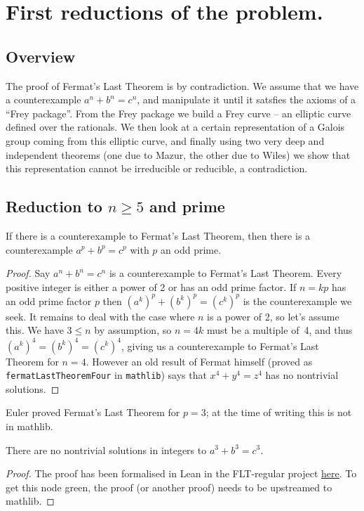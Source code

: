 \chapter{First reductions of the problem.}

\section{Overview}
The proof of Fermat's Last Theorem is by contradiction. We assume that we have a counterexample $a^n+b^n=c^n$, and manipulate it until it satsfies the axioms of a ``Frey package''. From the Frey package we build a Frey curve -- an elliptic curve defined over the rationals. We then look at a certain representation of a Galois group coming from this elliptic curve, and finally using two very deep and independent theorems (one due to Mazur, the other due to Wiles) we show that this representation cannot be irreducible or reducible, a contradiction.

\section{Reduction to $n\geq5$ and prime}

\begin{lemma}\label{WLOG_n_prime}\leanok
  If there is a counterexample to Fermat's Last Theorem, then there is a counterexample $a^p+b^p=c^p$
  with $p$ an odd prime.
\end{lemma}
\begin{proof}\leanok
  Say $a^n + b^n = c^n$ is a counterexample to Fermat's Last Theorem. Every positive integer is either
  a power of 2 or has an odd prime factor. If $n=kp$ has an odd prime factor $p$ then
  $(a^k)^p+(b^k)^p=(c^k)^p$ is the counterexample we seek. It remains to deal with the case where
  $n$ is a power of 2, so let's assume this. We have $3\leq n$ by assumption, so
  $n=4k$ must be a multiple of~4, and thus $(a^k)^4=(b^k)^4=(c^k)^4$, giving us a counterexample
  to Fermat's Last Theorem for $n=4$. However an old result of Fermat himself (proved as {\tt fermatLastTheoremFour} in {\tt mathlib}) says that $x^4+y^4=z^4$ has no nontrivial solutions.
\end{proof}

Euler proved Fermat's Last Theorem for $p=3$; at the time of writing this is not in mathlib.

\begin{lemma}\label{p_not_three}\leanok
  There are no nontrivial solutions in integers to $a^3+b^3=c^3$.
\end{lemma}
\begin{proof}
  The proof has been formalised in Lean in the FLT-regular project \href{https://github.com/leanprover-community/flt-regular/blob/861b7df057140b45b8bb7d30d33426ffbbdda52b/FltRegular/FltThree/FltThree.lean#L698}{\color{blue}\underline{here}}. To get this node green, the proof (or another proof) needs to be upstreamed to mathlib.
\end{proof}

